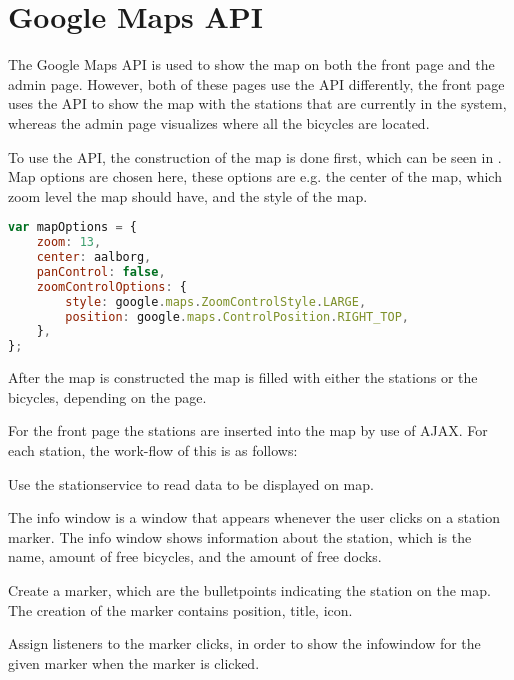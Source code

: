 \section{Google Maps API}\label{sec:googlemapsapi}
The Google Maps API \citep{misc:googlemapsapi} is used to show the map on both the front page and the admin page.
However, both of these pages use the API differently, the front page uses the API to show the map with the stations that are currently in the system, whereas the admin page visualizes where all the bicycles are located.

To use the API, the construction of the map is done first, which can be seen in .
Map options are chosen here, these options are e.g. the center of the map, which zoom level the map should have, and the style of the map.

\begin{minipage}{\textwidth}
\begin{lstlisting}[caption={Construction of the map}, label={lst:mapoptions}, language=Javascript]
var mapOptions = {
	zoom: 13,
	center: aalborg,
	panControl: false,
    zoomControlOptions: {
		style: google.maps.ZoomControlStyle.LARGE,
		position: google.maps.ControlPosition.RIGHT_TOP,
	},
};
\end{lstlisting}
\end{minipage}

After the map is constructed the map is filled with either the stations or the bicycles, depending on the page.

For the front page the stations are inserted into the map by use of AJAX.
For each station, the work-flow of this is as follows:

\begin{description}[style=nextline]
	\item[Gather data]
	Use the stationservice to read data to be displayed on map.
	\item[Create info window]
	The info window is a window that appears whenever the user clicks on a station marker.
	The info window shows information about the station, which is the name, amount of free bicycles, and the amount of free docks.
	\item[Marker creation]
	Create a marker, which are the bulletpoints indicating the station on the map.
	The creation of the marker contains position, title, icon.
	\item[Assign listeners]
	Assign listeners to the marker clicks, in order to show the infowindow for the given marker when the marker is clicked.
\end{description}

